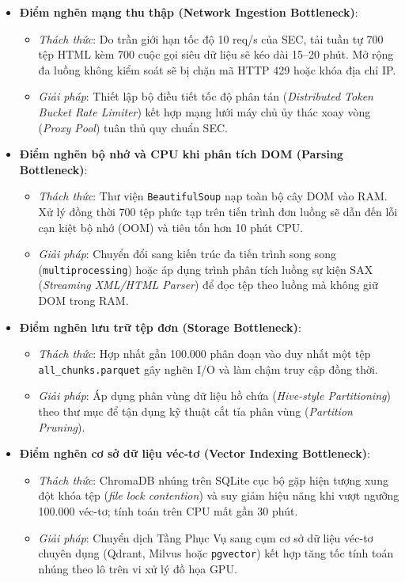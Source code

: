 \begin{itemize}
    \item \textbf{Điểm nghẽn mạng thu thập (Network Ingestion Bottleneck)}:
    \begin{itemize}
        \item \textit{Thách thức}: Do trần giới hạn tốc độ 10 req/s của SEC, tải tuần tự 700 tệp HTML kèm 700 cuộc gọi siêu dữ liệu sẽ kéo dài 15--20 phút. Mở rộng đa luồng không kiểm soát sẽ bị chặn mã HTTP 429 hoặc khóa địa chỉ IP.
        \item \textit{Giải pháp}: Thiết lập bộ điều tiết tốc độ phân tán (\textit{Distributed Token Bucket Rate Limiter}) kết hợp mạng lưới máy chủ ủy thác xoay vòng (\textit{Proxy Pool}) tuân thủ quy chuẩn SEC.
    \end{itemize}
    
    \item \textbf{Điểm nghẽn bộ nhớ và CPU khi phân tích DOM (Parsing Bottleneck)}:
    \begin{itemize}
        \item \textit{Thách thức}: Thư viện \texttt{BeautifulSoup} nạp toàn bộ cây DOM vào RAM. Xử lý đồng thời 700 tệp phức tạp trên tiến trình đơn luồng sẽ dẫn đến lỗi cạn kiệt bộ nhớ (OOM) và tiêu tốn hơn 10 phút CPU.
        \item \textit{Giải pháp}: Chuyển đổi sang kiến trúc đa tiến trình song song (\texttt{multiprocessing}) hoặc áp dụng trình phân tích luồng sự kiện SAX (\textit{Streaming XML/HTML Parser}) để đọc tệp theo luồng mà không giữ DOM trong RAM.
    \end{itemize}
    
    \item \textbf{Điểm nghẽn lưu trữ tệp đơn (Storage Bottleneck)}:
    \begin{itemize}
        \item \textit{Thách thức}: Hợp nhất gần 100.000 phân đoạn vào duy nhất một tệp \texttt{all\_chunks.parquet} gây nghẽn I/O và làm chậm truy cập đồng thời.
        \item \textit{Giải pháp}: Áp dụng phân vùng dữ liệu hồ chứa (\textit{Hive-style Partitioning}) theo thư mục  để tận dụng kỹ thuật cắt tỉa phân vùng (\textit{Partition Pruning}).
    \end{itemize}
    
    \item \textbf{Điểm nghẽn cơ sở dữ liệu véc-tơ (Vector Indexing Bottleneck)}:
    \begin{itemize}
        \item \textit{Thách thức}: ChromaDB nhúng trên SQLite cục bộ gặp hiện tượng xung đột khóa tệp (\textit{file lock contention}) và suy giảm hiệu năng khi vượt ngưỡng 100.000 véc-tơ; tính toán trên CPU mất gần 30 phút.
        \item \textit{Giải pháp}: Chuyển dịch Tầng Phục Vụ sang cụm cơ sở dữ liệu véc-tơ chuyên dụng (Qdrant, Milvus hoặc \texttt{pgvector}) kết hợp tăng tốc tính toán nhúng theo lô trên vi xử lý đồ họa GPU.
    \end{itemize}
\end{itemize}
